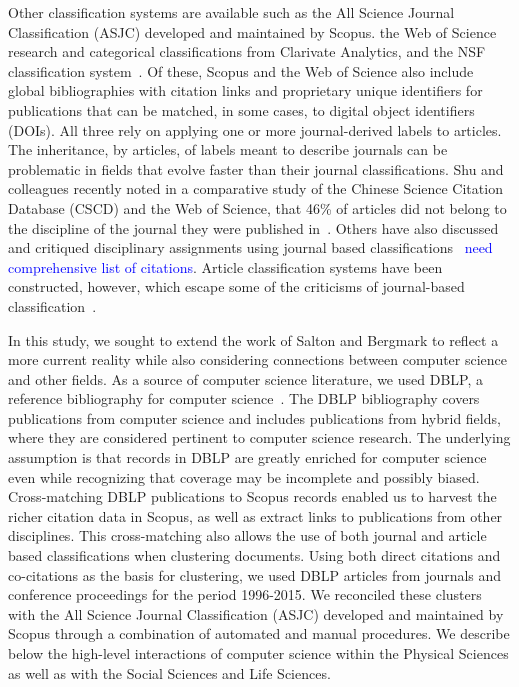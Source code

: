 Other classification systems are available such as the All Science Journal Classification (ASJC) developed and maintained by Scopus. the Web of Science research and categorical classifications from Clarivate Analytics, and the NSF classification system~\cite{nsf_classification}. Of these, Scopus and the Web of Science also include global bibliographies with citation links and proprietary unique identifiers for publications that can be matched, in some cases, to digital object identifiers (DOIs). All three rely on applying one or more journal-derived labels to articles. The inheritance, by articles, of labels meant to describe journals can be problematic in fields that evolve faster than their journal classifications. Shu and colleagues recently noted in a comparative study of the Chinese Science Citation Database (CSCD) and the Web of Science, that 46\% of articles did not belong to the discipline of the journal they were published in~\cite{shu_comparing_2019}. Others have also discussed and critiqued disciplinary assignments using journal based classifications~\cite{wang_large-scale_2016} \textcolor{blue}{need comprehensive list of citations}. Article classification systems have been constructed, however, which escape some of the criticisms of journal-based classification~\cite{traag_louvain_2019,boyack_classification_2014,waltman_new_2012}.
  
In this study, we sought to extend the work of Salton and Bergmark to reflect a more current reality while also considering connections between computer science and other fields. As a source of computer science literature, we used DBLP, a reference bibliography for computer science~\cite{dblp_ref}. The DBLP bibliography covers publications from computer science and includes publications from hybrid fields, where they are considered pertinent to computer science research. The underlying assumption is that records in DBLP are greatly enriched for computer science even while recognizing that coverage may be incomplete and possibly biased. Cross-matching DBLP publications to Scopus records enabled us to harvest the richer citation data in Scopus, as well as extract links to publications from other disciplines. This cross-matching also allows the use of both journal and article based classifications when clustering documents. Using both direct citations and co-citations as the basis for clustering, we used DBLP articles from journals and conference proceedings for the period 1996-2015. We reconciled these clusters with the All Science Journal Classification (ASJC) developed and maintained by Scopus through a combination of automated and manual procedures. We describe below the high-level interactions of computer science within the Physical Sciences as well as with the Social Sciences and Life Sciences. 

